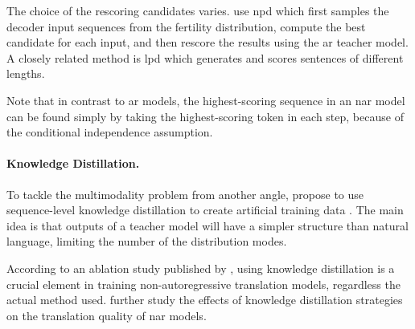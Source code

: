 The choice of the rescoring candidates varies. \citet{gu2017nonautoregressive}
use \ac{npd} which first samples the decoder input sequences from the fertility
distribution, compute the best candidate for each input, and then rescore the
results using the \ac{ar} teacher model. A closely related method is \ac{lpd}
which generates and scores sentences of different lengths.

Note that in contrast to \ac{ar} models, the highest-scoring sequence in an
\acs{nar} model can be found simply by taking the highest-scoring token in each
step, because of the conditional independence assumption.

\paragraph{Knowledge Distillation.} To tackle the multimodality problem from
another angle, \citet{gu2017nonautoregressive} propose to use sequence-level
knowledge distillation to create artificial training data
\citep{kim-rush-2016-sequence}. The main idea is that outputs of a teacher
model will have a simpler structure than natural language, limiting the number
of the distribution modes.

According to an ablation study published by \citet{gu-kong-2021-fully}, using
knowledge distillation is a crucial element in training non-autoregressive
translation models, regardless the actual method used.
\citet{zhou-etal-2020-understanding} further study the effects of knowledge
distillation strategies on the translation quality of \ac{nar} models.

